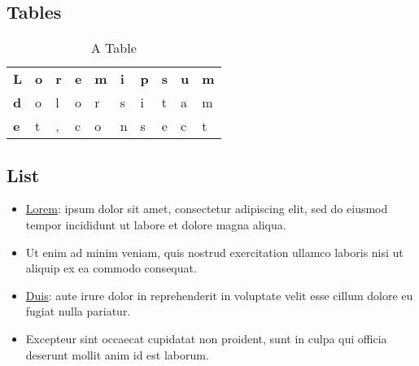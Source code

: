 \documentclass[12pt, a4paper]{article} %
\begin{document}
\subsection{Tables}


\begin{table}[H]
\centering
\caption{A Table}
\label{tab:tbl1}
\begin{tabular}{llllllllll}
\textbf{L}                      & \textbf{o}             & \textbf{r}             & \textbf{e}             & \textbf{m}             & \textbf{i}             & \textbf{p}             & \textbf{s}             & \textbf{u}             & \textbf{m}             \\ \cline{2-10} 
\multicolumn{1}{l|}{\textbf{d}} & \multicolumn{1}{l|}{o} & \multicolumn{1}{l|}{l} & \multicolumn{1}{l|}{o} & \multicolumn{1}{l|}{r} & \multicolumn{1}{l|}{s} & \multicolumn{1}{l|}{i} & \multicolumn{1}{l|}{t} & \multicolumn{1}{l|}{a} & \multicolumn{1}{l|}{m} \\ \cline{2-10} 
\multicolumn{1}{l|}{\textbf{e}} & \multicolumn{1}{l|}{t} & \multicolumn{1}{l|}{,} & \multicolumn{1}{l|}{c} & \multicolumn{1}{l|}{o} & \multicolumn{1}{l|}{n} & \multicolumn{1}{l|}{s} & \multicolumn{1}{l|}{e} & \multicolumn{1}{l|}{c} & \multicolumn{1}{l|}{t} \\ \cline{2-10} 
\end{tabular}
\end{table}

\subsection{List}

\begin{itemize}

\item \underline{Lorem}: ipsum dolor sit amet, consectetur adipiscing elit, sed do eiusmod tempor incididunt ut labore et dolore magna aliqua.
\item Ut enim ad minim veniam, quis nostrud exercitation ullamco laboris nisi ut aliquip ex ea commodo consequat.
\item \underline{Duis}: aute irure dolor in reprehenderit in voluptate velit esse cillum dolore eu fugiat nulla pariatur.
\item Excepteur sint occaecat cupidatat non proident, sunt in culpa qui officia deserunt mollit anim id est laborum.

\end{itemize}
\end{document}
